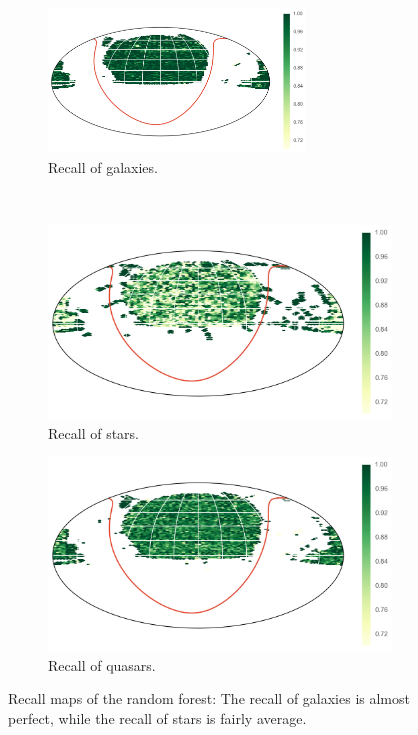 \begin{figure}[p]
	\centering
	\begin{subfigure}{\textwidth}
		\centering
		\includegraphics[width=0.75\textwidth]{figures/4_expt1/map_recall_forest_all_Galaxy}
		\caption{Recall of galaxies.}
		\label{fig:map_recall_forest_all_Galaxy}
	\end{subfigure}\\
	\begin{subfigure}{\textwidth}
		\centering
		\includegraphics[width=0.75\linewidth]{figures/4_expt1/map_recall_forest_all_Star}
		\caption{Recall of stars.}
		\label{fig:map_recall_forest_all_Star}
	\end{subfigure}
	\begin{subfigure}{\textwidth}
		\centering
		\includegraphics[width=0.75\linewidth]{figures/4_expt1/map_recall_forest_all_Quasar}
		\caption{Recall of quasars.}
		\label{fig:map_recall_forest_all_Quasar}
	\end{subfigure}
	\caption[Recall maps of the random forest]{Recall maps of the random forest: The recall of galaxies
        is almost perfect, while the recall of stars is fairly average.}
    
    \label{fig:map_recall_forest_all}
\end{figure}



